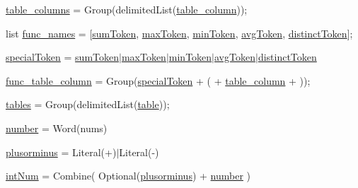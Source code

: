 \begin{DoxyCompactItemize}
\item 
\hyperlink{namespaceparse__query_a3e5401120fbf16c839c80e55e67e215e}{table\+\_\+columns} = Group(delimited\+List(\hyperlink{namespaceparse__query_a834dee534400bd080a0a16f06a77be78}{table\+\_\+column}));
\item 
list \hyperlink{namespaceparse__query_aa9f089f21476dbb671d1fde5cbe7a7bc}{func\+\_\+names} = \mbox{[}\hyperlink{namespaceparse__query_a8d38f4998f3935568112fcd8e31e06a3}{sum\+Token}, \hyperlink{namespaceparse__query_a1189a8897d300e08d3d4b00224482d79}{max\+Token}, \hyperlink{namespaceparse__query_a70846ee64743086995f9e5a5cf892eca}{min\+Token}, \hyperlink{namespaceparse__query_ac13d5a3fbab8872f67fb655514b59e1b}{avg\+Token}, \hyperlink{namespaceparse__query_a12a40f814458cd318eb56742bc0a84ab}{distinct\+Token}\mbox{]};
\item 
\hyperlink{namespaceparse__query_aee714d7bc945420e350fd4037ac31476}{special\+Token} = \hyperlink{namespaceparse__query_a8d38f4998f3935568112fcd8e31e06a3}{sum\+Token}$\vert$\hyperlink{namespaceparse__query_a1189a8897d300e08d3d4b00224482d79}{max\+Token}$\vert$\hyperlink{namespaceparse__query_a70846ee64743086995f9e5a5cf892eca}{min\+Token}$\vert$\hyperlink{namespaceparse__query_ac13d5a3fbab8872f67fb655514b59e1b}{avg\+Token}$\vert$\hyperlink{namespaceparse__query_a12a40f814458cd318eb56742bc0a84ab}{distinct\+Token}
\item 
\hyperlink{namespaceparse__query_a0dcad7340b58d9bb7af20ce8536ee213}{func\+\_\+table\+\_\+column} = Group(\hyperlink{namespaceparse__query_aee714d7bc945420e350fd4037ac31476}{special\+Token} + \textquotesingle{}(\textquotesingle{} + \hyperlink{namespaceparse__query_a834dee534400bd080a0a16f06a77be78}{table\+\_\+column} + \textquotesingle{})\textquotesingle{});
\item 
\hyperlink{namespaceparse__query_a770ec85d393de65ed54d45cf34c43f28}{tables} = Group(delimited\+List(\hyperlink{namespaceparse__query_a45fab7a8c6d7ac5d8cf43f37b4d29b7e}{table}));
\item 
\hyperlink{namespaceparse__query_a709ffd51e32f7b162656bb861d5d374d}{number} = Word(nums)
\item 
\hyperlink{namespaceparse__query_ac5dcea7577abdac23037689af0a2dc7d}{plusorminus} = Literal(\textquotesingle{}+\textquotesingle{})$\vert$Literal(\textquotesingle{}-\/\textquotesingle{})
\item 
\hyperlink{namespaceparse__query_abe733870f0060062cc27e12df022f113}{int\+Num} = Combine( Optional(\hyperlink{namespaceparse__query_ac5dcea7577abdac23037689af0a2dc7d}{plusorminus}) + \hyperlink{namespaceparse__query_a709ffd51e32f7b162656bb861d5d374d}{number} )

\end{DoxyCompactItemize}
